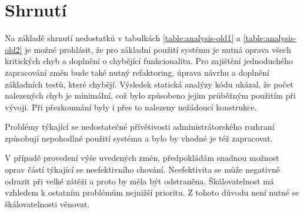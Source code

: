 \documentclass[thesis=B,czech]{FITthesis}[2012/06/26]
\begin{document}
\section{Shrnutí}\label{ch:project-analysis}

Na základě shrnutí nedostatků v tabulkách \ref{table:analysis-old1} a \ref{table:analysis-old2} je možné prohlásit, že pro základní použití systému je nutná oprava všech kritických chyb a doplnění o chybějící funkcionalitu. Pro zajištění jednoduchého zapracování změn bude také nutný refaktoring, úprava návrhu a doplnění základních testů, které chybějí.
Výsledek statická analýzy kódu ukázal, že počet nalezených chyb je minimální, což bylo způsobeno jejím průběžným použitím při vývoji. Při přezkoumání byly i přes to nalezeny nežádoucí konstrukce.
\par
Problémy týkající se nedostatečné přívětivosti administrátorského rozhraní způsobují nepohodlné použití systému a bylo by vhodné je též zapracovat.
\par
V případě provedení výše uvedených změn, předpokládám
snadnou možnost oprav částí týkající se neefektivního chování.
Neefektivita se může negativně odrazit při velké zátěži a proto by měla být odstraněna.
Škálovatelnost má vzhledem k ostatním problémům nejnižší prioritu. Z tohoto důvodu není nutné se škálovatelnosti věnovat.
\end{document}
